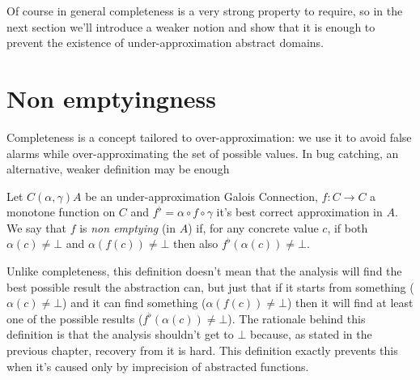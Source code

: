 Of course in general completeness is a very strong property to require, so in the next section we'll introduce a weaker notion and show that it is enough to prevent the existence of under-approximation abstract domains.

\section{Non emptyingness}
Completeness is a concept tailored to over-approximation: we use it to avoid false alarms while over-approximating the set of possible values. In bug catching, an alternative, weaker definition may be enough
\begin{definition}\label{ch3:def:non-emptying}
	Let $C (\alpha, \gamma) A$ be an under-approximation Galois Connection, $f : C \rightarrow C$ a monotone function on $C$ and $f^{\flat} = \alpha \circ f \circ \gamma$ it's best correct approximation in $A$.
	We say that $f$ is \textit{non emptying} (in $A$) if, for any concrete value $c$, if both $\alpha(c) \neq \bot$ and $\alpha(f(c)) \neq \bot$ then also $f^{\flat}(\alpha(c)) \neq \bot$.
\end{definition}

Unlike completeness, this definition doesn't mean that the analysis will find the best possible result the abstraction can, but just that if it starts from something ($\alpha(c) \neq \bot$) and it can find something ($\alpha(f(c)) \neq \bot$) then it will find at least one of the possible results ($f^{\flat}(\alpha(c)) \neq \bot$).
The rationale behind this definition is that the analysis shouldn't get to $\bot$ because, as stated in the previous chapter, recovery from it is hard. This definition exactly prevents this when it's caused only by imprecision of abstracted functions.

